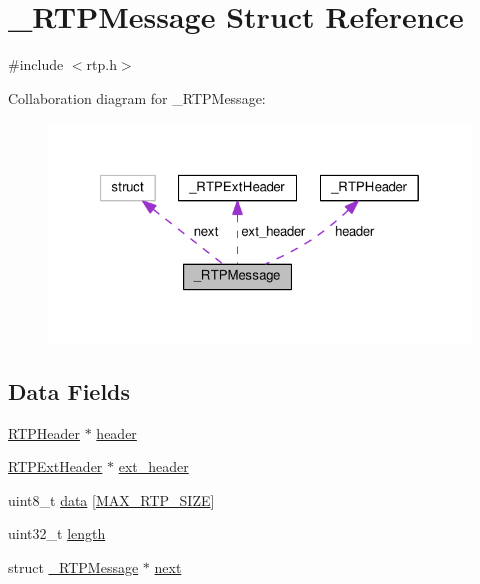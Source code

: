\hypertarget{struct___r_t_p_message}{\section{\+\_\+\+R\+T\+P\+Message Struct Reference}
\label{struct___r_t_p_message}
}


{\ttfamily \#include $<$rtp.\+h$>$}



Collaboration diagram for \+\_\+\+R\+T\+P\+Message\+:
\nopagebreak
\begin{figure}[H]
\begin{center}
\leavevmode
\includegraphics[width=321pt]{dc/d62/struct___r_t_p_message__coll__graph}
\end{center}
\end{figure}
\subsection*{Data Fields}
\begin{DoxyCompactItemize}
\item 
\hyperlink{rtp_8h_a75f2f434fb40aaadc6665cb0c9010e49}{R\+T\+P\+Header} $\ast$ \hyperlink{struct___r_t_p_message_afa0aee0d9eab5781c753943ec6a37584}{header}
\item 
\hyperlink{rtp_8h_ab384df54f92f379aa578740b96a3aaaa}{R\+T\+P\+Ext\+Header} $\ast$ \hyperlink{struct___r_t_p_message_aa0a69d899b1bee283ae1490f53bcd073}{ext\+\_\+header}
\item 
uint8\+\_\+t \hyperlink{struct___r_t_p_message_a89f8083b50c7cef74e96797bb74f8757}{data} \mbox{[}\hyperlink{rtp_8h_ac552c225344e6f60cbadb539fe35e6f5}{M\+A\+X\+\_\+\+R\+T\+P\+\_\+\+S\+I\+Z\+E}\mbox{]}
\item 
uint32\+\_\+t \hyperlink{struct___r_t_p_message_aebb70c2aab3407a9f05334c47131a43b}{length}
\item 
struct \hyperlink{struct___r_t_p_message}{\+\_\+\+R\+T\+P\+Message} $\ast$ \hyperlink{struct___r_t_p_message_af02d4bf6724c59e5df90bacdfc8a8499}{next}
\end{DoxyCompactItemize}



